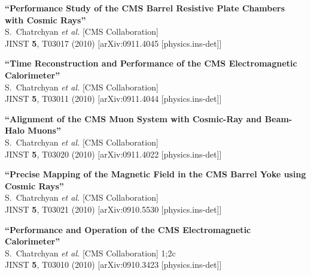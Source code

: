 \documentclass[10pt, a4paper]{article}
\begin{document}
\begin{thebibliography}{599}
{\bf ``Performance Study of the CMS Barrel Resistive Plate Chambers with Cosmic Rays''}
  \\{}S.~Chatrchyan {\it et al.}  [CMS Collaboration]
  \\{}JINST {\bf 5}, T03017 (2010)
  [arXiv:0911.4045 [physics.ins-det]]

{\bf ``Time Reconstruction and Performance of the CMS Electromagnetic Calorimeter''}
  \\{}S.~Chatrchyan {\it et al.}  [CMS Collaboration]
  \\{}JINST {\bf 5}, T03011 (2010)
  [arXiv:0911.4044 [physics.ins-det]]

{\bf ``Alignment of the CMS Muon System with Cosmic-Ray and Beam-Halo Muons''}
  \\{}S.~Chatrchyan {\it et al.}  [CMS Collaboration]
  \\{}JINST {\bf 5}, T03020 (2010)
  [arXiv:0911.4022 [physics.ins-det]]

{\bf ``Precise Mapping of the Magnetic Field in the CMS Barrel Yoke using Cosmic Rays''}
  \\{}S.~Chatrchyan {\it et al.}  [CMS Collaboration]
  \\{}JINST {\bf 5}, T03021 (2010)
  [arXiv:0910.5530 [physics.ins-det]]

{\bf ``Performance and Operation of the CMS Electromagnetic Calorimeter''}
  \\{}S.~Chatrchyan {\it et al.}  [CMS Collaboration]
1;2c  \\{}JINST {\bf 5}, T03010 (2010)
  [arXiv:0910.3423 [physics.ins-det]]


\end{thebibliography}
\end{document}

